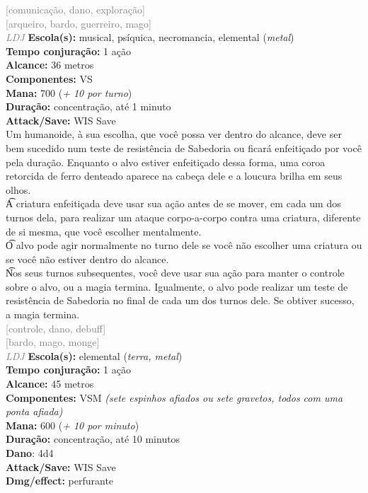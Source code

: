 \documentclass{RPG_Adventure}[2021/10/20]
\begin{document}
{\scriptsize \textcolor{gray}{[comunicação, dano, exploração]\\}}
{\scriptsize \textcolor{gray}{[arqueiro, bardo, guerreiro, mago]\\}}
{\tiny \textcolor{gray}{\textit{LDJ}}}
{\small \t \textbf{Escola(s):} musical, psíquica, necromancia, elemental (\textit{metal})\\\t \textbf{Tempo conjuração:} 1 ação\\\t \textbf{Alcance:} 36 metros\\\t \textbf{Componentes:} VS\\\t \textbf{Mana:} 700 (\textit{+ 10 por turno})\\\t \textbf{Duração:} concentração, até 1 minuto\\\t \textbf{Attack/Save:} WIS Save\\}
{\normalsize Um humanoide, à sua escolha, que você possa ver dentro do alcance, deve ser bem sucedido num teste de resistência de Sabedoria ou ficará enfeitiçado por você pela duração. Enquanto o alvo estiver enfeitiçado dessa forma, uma coroa retorcida de ferro denteado aparece na cabeça dele e a loucura brilha em seus olhos.\\\t A criatura enfeitiçada deve usar sua ação antes de se mover, em cada um dos turnos dela, para realizar um ataque corpo-a-corpo contra uma criatura, diferente de si mesma, que você escolher mentalmente.\\\t O alvo pode agir normalmente no turno dele se você não escolher uma criatura ou se você não estiver dentro do alcance.\\\t Nos seus turnos subsequentes, você deve usar sua ação para manter o controle sobre o alvo, ou a magia termina. Igualmente, o alvo pode realizar um teste de resistência de Sabedoria no final de cada um dos turnos dele. Se obtiver sucesso, a magia termina.\\}
{\scriptsize \textcolor{gray}{[controle, dano, debuff]\\}}
{\scriptsize \textcolor{gray}{[bardo, mago, monge]\\}}
{\tiny \textcolor{gray}{\textit{LDJ}}}
{\small \t \textbf{Escola(s):} elemental (\textit{terra, metal})\\\t \textbf{Tempo conjuração:} 1 ação\\\t \textbf{Alcance:} 45 metros\\\t \textbf{Componentes:} VSM \textit{(sete espinhos afiados ou sete gravetos, todos com uma ponta afiada)}\\\t \textbf{Mana:} 600 (\textit{+ 10 por minuto})\\\t \textbf{Duração:} concentração, até 10 minutos\\\t \textbf{Dano}: 4d4\\\t \textbf{Attack/Save:} WIS Save\\\t \textbf{Dmg/effect:} perfurante\\}
\end{document}
